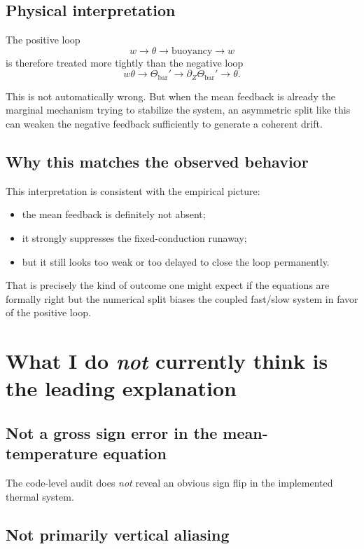 \documentclass[11pt]{article}
\begin{document}
\subsection{Physical interpretation}

The positive loop
\[
w \to \theta \to \text{buoyancy} \to w
\]
is therefore treated more tightly than the negative loop
\[
w\theta \to \Theta_{\mathrm{bar}}' \to \partial_Z\Theta_{\mathrm{bar}}' \to \theta.
\]

This is not automatically wrong. But when the mean feedback is already the marginal mechanism trying to stabilize the system, an asymmetric split like this can weaken the negative feedback sufficiently to generate a coherent drift.

\subsection{Why this matches the observed behavior}

This interpretation is consistent with the empirical picture:

\begin{itemize}
\item the mean feedback is definitely not absent;
\item it strongly suppresses the fixed-conduction runaway;
\item but it still looks too weak or too delayed to close the loop permanently.
\end{itemize}

That is precisely the kind of outcome one might expect if the equations are formally right but the numerical split biases the coupled fast/slow system in favor of the positive loop.

\section{What I do \emph{not} currently think is the leading explanation}

\subsection{Not a gross sign error in the mean-temperature equation}

The code-level audit does \emph{not} reveal an obvious sign flip in the implemented thermal system.

\subsection{Not primarily vertical aliasing}
\end{document}
